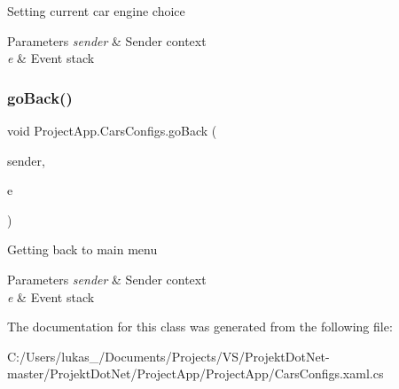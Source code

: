 Setting current car engine choice 


\begin{DoxyParams}{Parameters}
{\em sender} & Sender context\\
\hline
{\em e} & Event stack\\
\hline
\end{DoxyParams}
\mbox{\label{class_project_app_1_1_cars_configs_a02fb76e569baa27975b4e23456d1b7c0}} 
\subsubsection{\texorpdfstring{go\+Back()}{goBack()}}
{\footnotesize\ttfamily void Project\+App.\+Cars\+Configs.\+go\+Back (\begin{DoxyParamCaption}\item[{object}]{sender,  }\item[{Routed\+Event\+Args}]{e }\end{DoxyParamCaption})\hspace{0.3cm}{\ttfamily [private]}}



Getting back to main menu 


\begin{DoxyParams}{Parameters}
{\em sender} & Sender context\\
\hline
{\em e} & Event stack\\
\hline
\end{DoxyParams}


The documentation for this class was generated from the following file\+:\begin{DoxyCompactItemize}
\item 
C\+:/\+Users/lukas\+\_/\+Documents/\+Projects/\+V\+S/\+Projekt\+Dot\+Net-\/master/\+Projekt\+Dot\+Net/\+Project\+App/\+Project\+App/Cars\+Configs.\+xaml.\+cs\end{DoxyCompactItemize}
